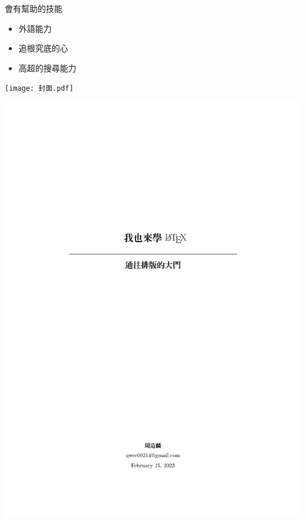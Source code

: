 \begin{tcolorbox}
會有幫助的技能
\end{tcolorbox}
\begin{LARGE}
\begin{itemize}
\item 外語能力
\item 追根究底的心
\item 高超的搜尋能力
\end{itemize}
\end{LARGE}
\newpage
\newpage
\begin{figboxs}
\centering
\texttt{[image: 封面.pdf]}
\end{figboxs}
\newpage
\begin{figboxs}
\centering
\includegraphics[page = 36, height = \textheight - 24pt, trim={0 8cm 0 2cm}, clip]{main.pdf}
\end{figboxs}
